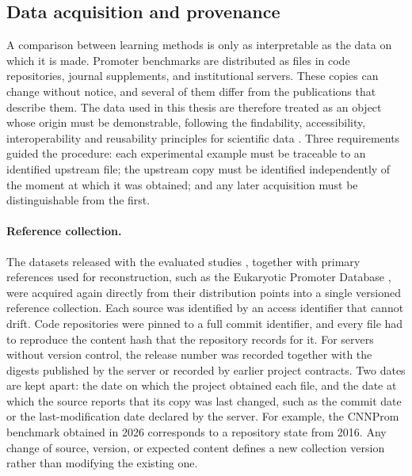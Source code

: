\subsection{Data acquisition and provenance}\label{sec:methods-data-acquisition}

A comparison between learning methods is only as interpretable as the data on
which it is made. Promoter benchmarks are distributed as files in code
repositories, journal supplements, and institutional servers. These copies can
change without notice, and several of them differ from the publications that
describe them. The data used in this thesis are therefore treated as an object
whose origin must be demonstrable, following the findability, accessibility,
interoperability and reusability principles for scientific data
\citep{wilkinson2016fair}. Three requirements guided the procedure: each
experimental example must be traceable to an identified upstream file; the
upstream copy must be identified independently of the moment at which it was
obtained; and any later acquisition must be distinguishable from the first.

\paragraph{Reference collection.}
The datasets released with the evaluated studies
\citep{umarov2017recognition,bhandari2021comparison,martinez2024cdbprom,zhang2024graphpro},
together with primary references used for reconstruction, such as the
Eukaryotic Promoter Database \citep{meylan2020epd}, were acquired again directly
from their distribution points into a single versioned reference collection.
Each source was identified by an access identifier that cannot drift. Code
repositories were pinned to a full commit identifier, and every file had to
reproduce the content hash that the repository records for it. For servers
without version control, the release number was recorded together with the
digests published by the server or recorded by earlier project contracts. Two
dates are kept apart: the date on which the project obtained each file, and the
date at which the source reports that its copy was last changed, such as the
commit date or the last-modification date declared by the server. For example,
the CNNProm benchmark obtained in 2026 corresponds to a repository state from
2016. Any change of source, version, or expected content defines a new
collection version rather than modifying the existing one.

